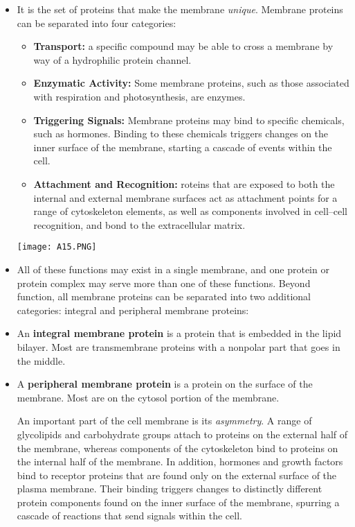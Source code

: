 \documentclass[letterpaper]{article}
\begin{document}
\begin{itemize}
\item It is the set of proteins that make the membrane \textit{unique}. Membrane proteins can be separated into four categories:
\begin{itemize}
    \item \textbf{Transport:} a specific compound may be able to cross a membrane by way of a hydrophilic protein channel.
    \item \textbf{Enzymatic Activity:} Some membrane proteins, such as those associated with respiration and photosynthesis, are enzymes.
    \item \textbf{Triggering Signals:} Membrane proteins may bind to specific chemicals, such as hormones. Binding to these chemicals triggers changes on the inner surface of the membrane, starting a cascade of events within the cell.
    \item \textbf{Attachment and Recognition:} roteins that are exposed to both the internal and external membrane surfaces act as attachment points for a range of cytoskeleton elements, as well as components involved in cell–cell recognition, and bond to the extracellular matrix.
\end{itemize}
\begin{center}\texttt{[image: A15.PNG]}\end{center}
\item All of these functions may exist in a single membrane, and one protein or protein complex may serve more than one of these functions. Beyond function, all membrane proteins can be separated into two additional categories: integral and peripheral membrane proteins:
\item An \textbf{integral membrane protein} is a protein that is embedded in the lipid bilayer. Most are transmembrane proteins with a nonpolar part that goes in the middle.
\item A \textbf{peripheral membrane protein} is a protein on the surface of the membrane. Most are on the cytosol portion of the membrane.
\begin{review}
    An important part of the cell membrane is its \textit{asymmetry}. A range of glycolipids and carbohydrate groups attach to proteins on the external half of the membrane, whereas components of the cytoskeleton bind to proteins on the internal half of the membrane. In addition, hormones and growth factors bind to receptor proteins that are found only on the external surface of the plasma membrane. Their binding triggers changes to distinctly different protein components found on the inner surface of the membrane, spurring a cascade of reactions that send signals within the cell.

\end{review}
\end{itemize}
\end{document}
